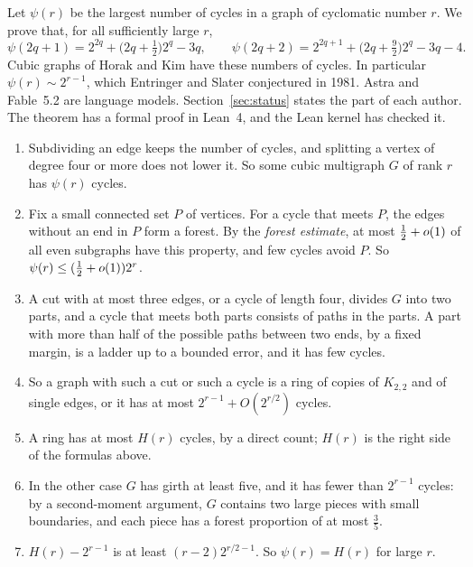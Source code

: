 \documentclass[11pt]{article}
\begin{document}
\maketitleblock

Let $\psi(r)$ be the largest number of cycles in a graph of cyclomatic number $r$. We prove that,
for all sufficiently large $r$,
\[
  \psi(2q+1)=2^{2q}+\bigl(2q+\tfrac12\bigr)2^{q}-3q,\qquad
  \psi(2q+2)=2^{2q+1}+\bigl(2q+\tfrac92\bigr)2^{q}-3q-4 .
\]
Cubic graphs of Horak and Kim have these numbers of cycles. In particular
$\psi(r)\sim2^{r-1}$, which Entringer and Slater conjectured in 1981. Astra and Fable~5.2 are
language models. Section~\ref{sec:status} states the part of each author. The theorem has a
formal proof in Lean~4, and the Lean kernel has checked it.

\begin{enumerate}[leftmargin=1.6em]
\item Subdividing an edge keeps the number of cycles, and splitting a vertex of degree four or
more does not lower it. So some cubic multigraph $G$ of rank $r$ has $\psi(r)$ cycles.
\item Fix a small connected set $P$ of vertices. For a cycle that meets $P$, the edges without
an end in $P$ form a forest. By the \emph{forest estimate}, at most $\tfrac12+o(1)$ of all even
subgraphs have this property, and few cycles avoid $P$. So $\psi(r)\le(\tfrac12+o(1))2^{r}$.
\item A cut with at most three edges, or a cycle of length four, divides $G$ into two parts,
and a cycle that meets both parts consists of paths in the parts. A part with more than half of
the possible paths between two ends, by a fixed margin, is a ladder up to a bounded error, and
it has few cycles.
\item So a graph with such a cut or such a cycle is a ring of copies of $K_{2,2}$ and of single
edges, or it has at most $2^{r-1}+O(2^{r/2})$ cycles.
\item A ring has at most $H(r)$ cycles, by a direct count; $H(r)$ is the right side of the
formulas above.
\item In the other case $G$ has girth at least five, and it has fewer than $2^{r-1}$ cycles:
by a second-moment argument, $G$ contains two large pieces with small boundaries, and each piece
has a forest proportion of at most $\frac35$.
\item $H(r)-2^{r-1}$ is at least $(r-2)2^{r/2-1}$. So $\psi(r)=H(r)$ for large $r$.
\end{enumerate}

\contentsblock









\end{document}
